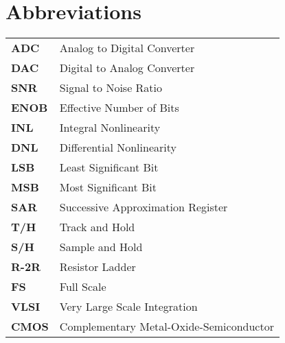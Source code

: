 \chapter*{Abbreviations}
\vspace{5mm}
\begin{tabular}{ll}
\textbf{ADC}  & Analog to Digital Converter \\
\textbf{DAC}  & Digital to Analog Converter \\
\textbf{SNR}  & Signal to Noise Ratio \\
\textbf{ENOB} & Effective Number of Bits \\
\textbf{INL}  & Integral Nonlinearity \\
\textbf{DNL}  & Differential Nonlinearity \\
\textbf{LSB}  & Least Significant Bit \\
\textbf{MSB}  & Most Significant Bit \\
\textbf{SAR}  & Successive Approximation Register \\
\textbf{T/H}  & Track and Hold \\
\textbf{S/H}  & Sample and Hold \\
\textbf{R-2R} & Resistor Ladder \\
\textbf{FS}   & Full Scale \\
\textbf{VLSI} & Very Large Scale Integration \\
\textbf{CMOS} & Complementary Metal-Oxide-Semiconductor \\
\end{tabular}
